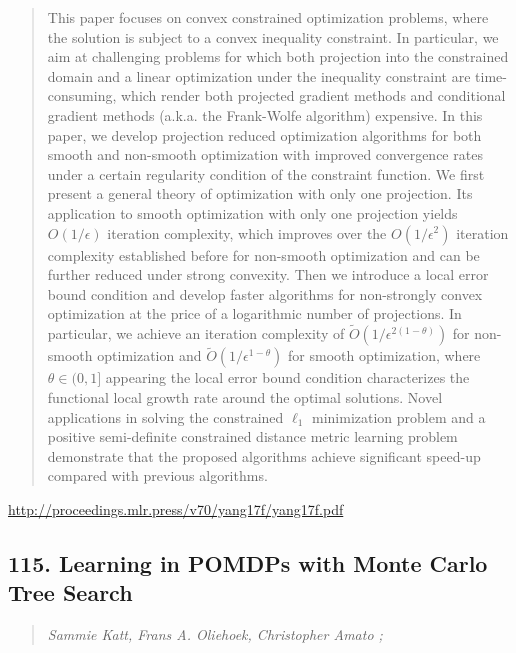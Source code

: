 \documentclass{article}
\begin{document}
\begin{quote}
    This paper focuses on convex constrained optimization problems, where the solution is subject to a convex inequality constraint. In particular, we aim at challenging problems for which both projection into the constrained domain and a linear optimization under the inequality constraint are time-consuming, which render both projected gradient methods and conditional gradient methods (a.k.a. the Frank-Wolfe algorithm) expensive. In this paper, we develop projection reduced optimization algorithms for both smooth and non-smooth optimization with improved convergence rates under a certain regularity condition of the constraint function. We first present a general theory of optimization with only one projection. Its application to smooth optimization with only one projection yields $O(1/\epsilon)$ iteration complexity, which improves over the $O(1/\epsilon^2)$ iteration complexity established before for non-smooth optimization and can be further reduced under strong convexity. Then we introduce a local error bound condition and develop faster algorithms for non-strongly convex optimization at the price of a logarithmic number of projections. In particular, we achieve an iteration complexity of $\widetilde O(1/\epsilon^{2(1-\theta)})$ for non-smooth optimization and $\widetilde O(1/\epsilon^{1-\theta})$ for smooth optimization, where $\theta\in(0,1]$ appearing the local error bound condition characterizes the functional local growth rate around the optimal solutions. Novel applications in solving the constrained $\ell_1$ minimization problem and a positive semi-definite constrained distance metric learning problem demonstrate that the proposed algorithms achieve significant speed-up compared with previous algorithms.  
\end{quote}

\href{http://proceedings.mlr.press/v70/yang17f/yang17f.pdf}{http://proceedings.mlr.press/v70/yang17f/yang17f.pdf}

\subsection{115. Learning in POMDPs with Monte Carlo Tree Search}

\begin{quote}
\footnotesize{\textit{Sammie Katt, Frans A. Oliehoek, Christopher Amato ;}}

\end{quote}
\end{document}
